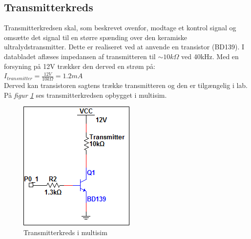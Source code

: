 \subsection{Transmitterkreds}
Transmitterkredsen skal, som beskrevet ovenfor, modtage et kontrol signal og omsætte det signal til en større spænding over den keramiske ultralydstransmitter. Dette er realiseret ved at anvende en transistor (BD139). I databladet aflæses impedansen af transmitteren til $\sim10k\Omega$ ved 40kHz. Med en forsyning på 12V trækker den derved en strøm på:\\
$I_{transmitter}=\frac{12V}{10k\Omega}=1.2mA$\\
Derved kan transistoren sagtens trække transmitteren og den er tilgængelig i lab.\\
På \textit{figur \ref{fig:transmitterkreds}} ses transmitterkredsen opbygget i multisim.

\begin{figure}[H]
\centering
\includegraphics[scale=.75]{billeder/transmitterkreds}
\caption{Transmitterkreds i multisim}
\label{fig:transmitterkreds}
\end{figure}

